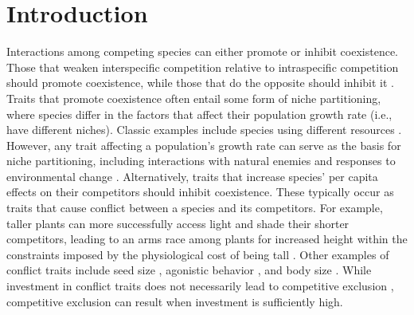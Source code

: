 
\section*{Introduction}

Interactions among competing species can either promote or inhibit
coexistence. Those that weaken interspecific competition relative to
intraspecific competition should promote coexistence, while those that
do the opposite should inhibit it \citep{Chesson2000}. Traits
that promote coexistence often entail some form of niche partitioning,
where species differ in the factors that affect their population growth
rate (i.e., have different niches). Classic examples
include species using different resources
\citep{Abrams2009, Macarthur1967a, Roughgarden1976}. However,
any trait affecting a population's growth rate can serve as the basis
for niche partitioning, including interactions with natural enemies
\citep{Abrams2002, Ehrlich2017, Grover1998, Vandermeer1998} and
responses to environmental change \citep{Armstrong1976, Chesson1994,
Chesson1997, Kremer2017, Loreau1992, Pacala1994}. Alternatively,
traits that increase species' per capita effects on their competitors
should inhibit coexistence. These typically occur as traits that cause 
conflict between a species and its competitors. For example, taller plants 
can more successfully access light and shade their shorter competitors, 
leading to an arms race among plants for increased height within the 
constraints imposed by the physiological cost of being tall
\citep{Falster2003}. Other examples of conflict traits include
seed size \citep{Fagerstrdm2016, Geritz1999}, agonistic behavior
\citep{Brown1971}, and body size \citep{Kisdi2001}.
While investment in conflict traits does not necessarily lead to
competitive exclusion \citep{Falster2003, Kisdi2001},
competitive exclusion can result when investment is sufficiently high.

